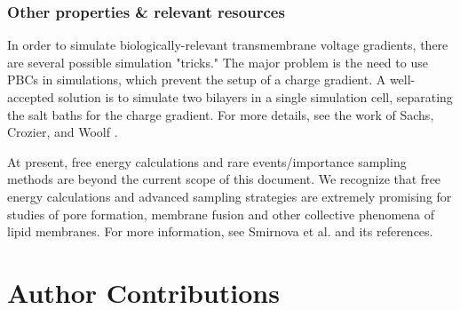 \documentclass[9pt,bestpractices]{livecoms}
\begin{document}
\subsubsection{Other properties \& relevant resources}
\label{subsubsec:otherprops}
In order to simulate biologically-relevant transmembrane voltage gradients, there are several possible simulation "tricks."
The major problem is the need to use PBCs in simulations, which prevent the setup of a charge gradient.
A well-accepted solution is to simulate two bilayers in a single simulation cell, separating the salt baths for the charge gradient.
For more details, see the work of Sachs, Crozier, and Woolf \cite{Sachs2004}.

At present, free energy calculations and rare events/importance sampling methods are beyond the current scope of this document.
We recognize that free energy calculations and advanced sampling strategies are extremely promising for studies of pore formation, membrane fusion and other collective phenomena of lipid membranes.
For more information, see Smirnova et al. \cite{Smirnova2015} and its references.\cite{Venable2015,Marrink2004}


%
%





\section{Author Contributions}
%
\end{document}
